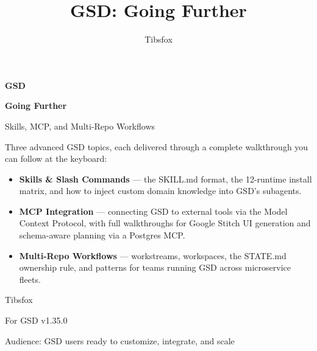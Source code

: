 \documentclass[11pt,letterpaper,openany]{book}
\title{GSD: Going Further}
\author{Tibsfox}
\date{}
\begin{document}
\begin{titlepage}
\centering
\vspace*{2cm}
{\headingfont\Huge\bfseries\color{gsdnavy} GSD\par}
\vspace{0.4cm}
{\headingfont\LARGE\bfseries\color{gsdnavy} Going Further\par}
\vspace{0.8cm}
{\headingfont\large Skills, MCP, and Multi-Repo Workflows\par}
\vspace{2cm}
\begin{tcolorbox}[
  enhanced,
  width=0.78\textwidth,
  colback=gsdnotebg,
  colframe=gsdnotebar,
  boxrule=0.6pt,
  arc=3pt,
  fonttitle=\bfseries\headingfont,
  title={What This Guide Covers}
]
\small
Three advanced GSD topics, each delivered through a complete walkthrough you
can follow at the keyboard:
\begin{itemize}[leftmargin=1.2em,itemsep=0.15em]
  \item \textbf{Skills \& Slash Commands} --- the SKILL.md format, the
        12-runtime install matrix, and how to inject custom domain
        knowledge into GSD's subagents.
  \item \textbf{MCP Integration} --- connecting GSD to external tools via
        the Model Context Protocol, with full walkthroughs for Google
        Stitch UI generation and schema-aware planning via a Postgres MCP.
  \item \textbf{Multi-Repo Workflows} --- workstreams, workspaces, the
        STATE.md ownership rule, and patterns for teams running GSD across
        microservice fleets.
\end{itemize}
\end{tcolorbox}
\vspace{2cm}
{\large Tibsfox\par}
\vspace{0.4cm}
{\small For GSD v1.35.0 \par}
\vspace{0.4cm}
{\small Audience: GSD users ready to customize, integrate, and scale \par}
\vfill
{\footnotesize \cclicense\par}
\end{titlepage}

\tableofcontents
\clearpage

\end{document}
